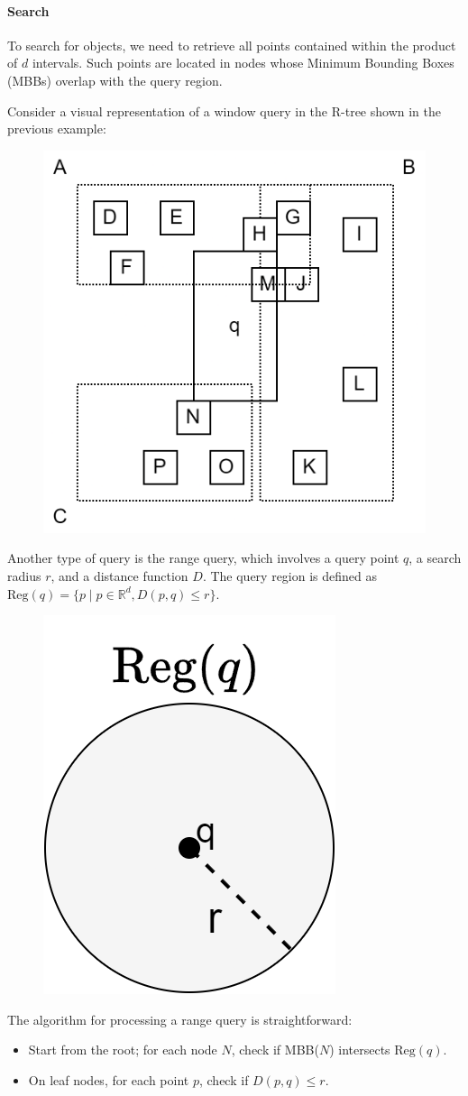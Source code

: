 \paragraph*{Search}
To search for objects, we need to retrieve all points contained within the product of $d$ intervals. 
Such points are located in nodes whose Minimum Bounding Boxes (MBBs) overlap with the query region.
\begin{example}
    Consider a visual representation of a window query in the R-tree shown in the previous example:
    \begin{figure}[H]
        \centering
        \includegraphics[width=0.4\linewidth]{images/r3.png}
    \end{figure}
\end{example}
Another type of query is the range query, which involves a query point $q$, a search radius $r$, and a distance function $D$.
The query region is defined as $\text{Reg}(q)=\{p\mid  p \in \mathbb{R}^d, D(p,q) \leq r\}$. 
\begin{figure}[H]
    \centering
    \includegraphics[width=0.15\linewidth]{images/r4.png}
\end{figure}
The algorithm for processing a range query is straightforward:
\begin{itemize}
    \item Start from the root; for each node $N$, check if MBB($N$) intersects $\text{Reg}(q)$. 
    \item On leaf nodes, for each point $p$, check if $D(p,q) \leq r$. 
\end{itemize}


